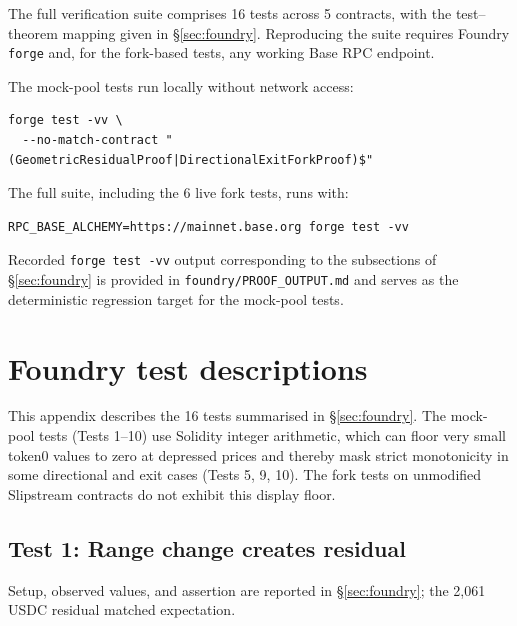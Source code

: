 \documentclass[11pt,a4paper]{article}
\renewcommand{\arraystretch}{1.05}
\theoremstyle{plain}
\newenvironment{codeblock}{%
  \begin{mdframed}[%
    backgroundcolor=brown!3!white,%
    linewidth=0pt,%
    innertopmargin=6pt,%
    innerbottommargin=6pt,%
    innerleftmargin=12pt,%
    innerrightmargin=12pt,%
    leftmargin=0.075\linewidth,%
    rightmargin=0.075\linewidth,%
    skipabove=6pt,%
    skipbelow=6pt%
  ]\footnotesize%
}{%
  \end{mdframed}%
}
\begin{document}
The full verification suite comprises 16 tests across 5 contracts, with the test--theorem mapping given in \S\ref{sec:foundry}. Reproducing the suite requires Foundry \texttt{forge} and, for the fork-based tests, any working Base RPC endpoint.

The mock-pool tests run locally without network access:

\begin{codeblock}
\begin{verbatim}
forge test -vv \
  --no-match-contract "(GeometricResidualProof|DirectionalExitForkProof)$"
\end{verbatim}
\end{codeblock}

The full suite, including the 6 live fork tests, runs with:

\begin{codeblock}
\begin{verbatim}
RPC_BASE_ALCHEMY=https://mainnet.base.org forge test -vv
\end{verbatim}
\end{codeblock}

Recorded \texttt{forge test -vv} output corresponding to the subsections of \S\ref{sec:foundry} is provided in \texttt{foundry/PROOF\_OUTPUT.md} and serves as the deterministic regression target for the mock-pool tests.

\section{Foundry test descriptions}\label{app:foundry-detailed}

\renewcommand{\arraystretch}{1.0}
\setlength{\tabcolsep}{5pt}

This appendix describes the 16 tests summarised in \S\ref{sec:foundry}. The mock-pool tests (Tests 1--10) use Solidity integer arithmetic, which can floor very small token0 values to zero at depressed prices and thereby mask strict monotonicity in some directional and exit cases (Tests 5, 9, 10). The fork tests on unmodified Slipstream contracts do not exhibit this display floor.

\subsection{Test 1: Range change creates residual}\label{sec:foundry-mock-residual}

Setup, observed values, and assertion are reported in \S\ref{sec:foundry}; the 2{,}061 USDC residual matched expectation.
\end{document}
